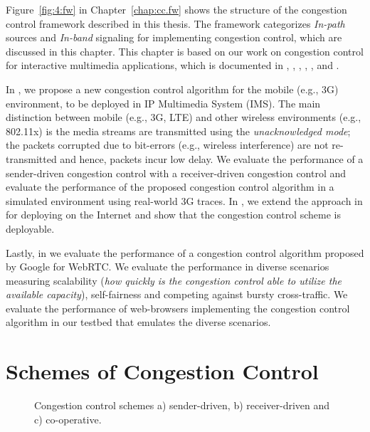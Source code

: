 Figure~\ref{fig:4:fw} in Chapter~\ref{chap:cc.fw} shows the structure of the
congestion control framework described in this thesis. The framework
categorizes \emph{In-path} sources and \emph{In-band} signaling for
implementing congestion control, which are discussed in this chapter. This
chapter is based on our work on congestion control for interactive multimedia
applications, which is documented in , ,
, \cite{draft.xr.discard.rle},
\cite{draft.xr.bytes.discarded}, \cite{singh:2010.thesis} and
\cite{Singh:control.loops.api}.

In , we propose a new congestion control algorithm for the
mobile (e.g., 3G) environment, to be deployed in IP Multimedia System (IMS).
The main distinction between mobile (e.g., 3G, LTE) and other wireless
environments (e.g., 802.11x) is the media streams are transmitted using the
\emph{unacknowledged mode}; the packets corrupted due to bit-errors (e.g.,
wireless interference) are not re-transmitted and hence, packets incur low
delay. We evaluate the performance of a sender-driven congestion control with
a receiver-driven congestion control and evaluate the performance of the
proposed congestion control algorithm in a simulated environment using
real-world 3G traces. In , we extend the approach in
 for deploying on the Internet and show that the congestion
control scheme is deployable. 

Lastly, in  we evaluate the performance of a congestion
control algorithm proposed by Google for WebRTC. We evaluate the performance
in diverse scenarios measuring scalability (\emph{how quickly is the
congestion control able to utilize the available capacity}), self-fairness and
competing against bursty cross-traffic. We evaluate the performance of
web-browsers implementing the congestion control algorithm in our testbed that
emulates the diverse scenarios.

\section{Schemes of Congestion Control}

\begin{figure}
  \centerline{
  }
  \centerline{
  }
  \centerline{
  }
  \caption{Congestion control schemes a) sender-driven, b) receiver-driven
and c) co-operative.}
  \label{fig:cc:scheme}
\end{figure}

